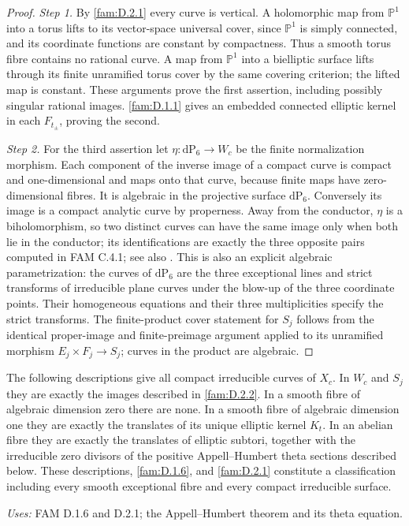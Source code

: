 \begin{proof}
\par\noindent\textit{Step 1.} By \ref{fam:D.2.1} every curve is vertical. A holomorphic map from
\(\mathbb P^1\) into a torus lifts to its vector-space universal cover,
since \(\mathbb P^1\) is simply connected, and its coordinate functions
are constant by compactness. Thus a smooth torus fibre contains no
rational curve. A map from \(\mathbb P^1\) into a bielliptic surface
lifts through its finite unramified torus cover by the same covering
criterion; the lifted map is constant. These arguments prove the first
assertion, including possibly singular rational images.
\ref{fam:D.1.1} gives an embedded connected elliptic kernel in each \(F_{t_\pm}\),
proving the second.

\par\noindent\textit{Step 2.} For the third assertion let \(\eta:\mathrm{dP}_6\to W_c\) be the finite
normalization morphism. Each component of the inverse image of a compact
curve is compact and one-dimensional and maps onto that curve, because
finite maps have zero-dimensional fibres. It is algebraic in the
projective surface \(\mathrm{dP}_6\). Conversely its image is a compact
analytic curve by properness. Away from the conductor, \(\eta\) is a
biholomorphism, so two distinct curves can have the same image only when
both lie in the conductor; its identifications are exactly the three
opposite pairs computed in FAM C.4.1; see also \cite[\S4.6, Proposition~4.6]{AC26}. This is also an explicit algebraic
parametrization: the curves of \(\mathrm{dP}_6\) are the three exceptional
lines and strict transforms of irreducible plane curves under the blow-up
of the three coordinate points. Their homogeneous equations and their
three multiplicities specify the strict transforms. The finite-product
cover statement for \(S_j\) follows from the identical proper-image and
finite-preimage argument applied to its unramified morphism
\(E_j\times F_j\to S_j\); curves in the product are algebraic.
\end{proof}

\begin{theorem}[FAM D.2.3; T]\label{fam:D.2.3}
The following descriptions give all compact irreducible curves of $X_c$.
In $W_c$ and $S_j$ they are exactly the images described in \ref{fam:D.2.2}.
In a smooth fibre of algebraic dimension zero there are none. In a
smooth fibre of algebraic dimension one they are exactly the translates
of its unique elliptic kernel $K_t$. In an abelian fibre they are exactly
the translates of elliptic subtori, together with the irreducible zero
divisors of the positive Appell--Humbert theta sections described below.
These descriptions, \ref{fam:D.1.6}, and \ref{fam:D.2.1} constitute a classification including
every smooth exceptional fibre and every compact irreducible surface.
\end{theorem}
\noindent\emph{Uses:} FAM D.1.6 and D.2.1; the Appell--Humbert theorem and its theta equation.\par

